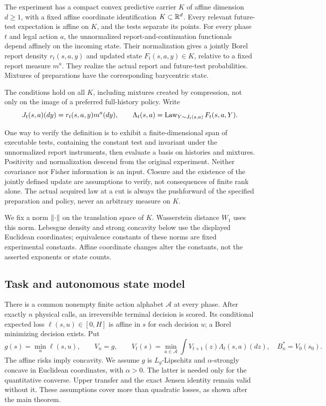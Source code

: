 \begin{definition}\label{def:affine}
The experiment has a compact convex predictive carrier $K$ of affine dimension $d\ge1$, with a fixed affine coordinate identification $K\subset\mathbb R^d$. Every relevant future-test expectation is affine on $K$, and the tests separate its points. For every phase $t$ and legal action $a$, the unnormalized report-and-continuation functionals depend affinely on the incoming state. Their normalization gives a jointly Borel report density $r_t(s,a,y)$ and updated state $F_t(s,a,y)\in K$, relative to a fixed report measure $m^a$. They realize the actual report and future-test probabilities. Mixtures of preparations have the corresponding barycentric state.

The conditions hold on all $K$, including mixtures created by compression, not only on the image of a preferred full-history policy. Write
\begin{equation}\label{eq:Lambda}
 J_t(s,a)(dy)=r_t(s,a,y)m^a(dy),\qquad
 \Lambda_t(s,a)=\operatorname{Law}_{Y\sim J_t(s,a)}F_t(s,a,Y).
\end{equation}
\end{definition}
One way to verify the definition is to exhibit a finite-dimensional span of executable tests, containing the constant test and invariant under the unnormalized report instruments, then evaluate a basis on histories and mixtures. Positivity and normalization descend from the original experiment. Neither covariance nor Fisher information is an input. Closure and the existence of the jointly defined update are assumptions to verify, not consequences of finite rank alone. The actual acquired law at a cut is always the pushforward of the specified preparation and policy, never an arbitrary measure on $K$.

We fix a norm $\left\lVert\cdot\right\rVert$ on the translation space of $K$. Wasserstein distance $W_1$ uses this norm. Lebesgue density and strong concavity below use the displayed Euclidean coordinates; equivalence constants of these norms are fixed experimental constants. Affine coordinate changes alter the constants, not the asserted exponents or state counts.

\subsection{Task and autonomous state model}
There is a common nonempty finite action alphabet $\mathcal A$ at every phase. After exactly $n$ physical calls, an irreversible terminal decision is scored. Its conditional expected loss $\ell(s,u)\in[0,H]$ is affine in $s$ for each decision $u$; a Borel minimizing decision exists. Put
\begin{equation}\label{eq:g}
 g(s)=\min_u\ell(s,u),\qquad V_n=g,\qquad
 V_t(s)=\min_{a\in\mathcal A}\int V_{t+1}(z)\Lambda_t(s,a)(dz),\quad B_n^*=V_0(s_0).
\end{equation}
The affine risks imply concavity. We assume $g$ is $L_g$-Lipschitz and $\alpha$-strongly concave in Euclidean coordinates, with $\alpha>0$. The latter is needed only for the quantitative converse. Upper transfer and the exact Jensen identity remain valid without it. These assumptions cover more than quadratic losses, as shown after the main theorem.


